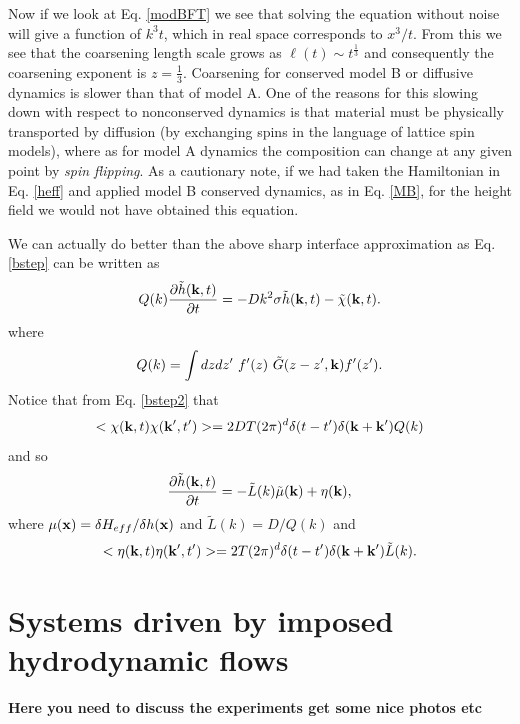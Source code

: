 Now if we look at Eq. \eqref{modBFT} we see that solving the equation without noise will give a function of $k^3t$, which in real space corresponds to $x^3/t$. From this we see that the coarsening length scale grows as $\ell(t) \sim t^{\frac{1}{3}}$ and consequently the coarsening exponent is $z=\frac{1}{3}$.  Coarsening for conserved model B or diffusive dynamics is slower than that of model A. One of the reasons for this slowing down with respect to nonconserved dynamics is that material must be physically transported by diffusion (by exchanging spins in the language of lattice spin models), where as for  model A dynamics the composition can change at any given point by {\em spin flipping}. As a cautionary note, if we had taken the
Hamiltonian in Eq. \eqref{heff} and applied model B conserved dynamics, as in Eq. \eqref{MB},  for the height field we would not have obtained this equation. 

We can actually do better than the above sharp interface approximation as Eq. \eqref{bstep} can be written as
\begin{equation}
    Q(k)\frac{\partial\tilde h({\bf k},t)}{\partial t} =  -Dk^2\sigma \tilde h({\bf k},t) - \tilde \chi({\bf k},t).
    \label{bstep2}
\end{equation}
where 
\begin{equation}
    Q(k)= \int dzdz' \ f'(z)\ \tilde G(z-z',{\bf k}) f'(z').
\end{equation}
Notice that from Eq. \eqref{bstep2} that
\begin{equation}
    < \chi({\bf k},t)\chi({\bf k}',t')>  = 2DT(2\pi)^d \delta(t-t') \delta({\bf k}+{\bf k'}) Q(k)\end{equation}
and so 
\begin{equation}
    \frac{\partial\tilde h({\bf k},t)}{\partial t}= -\tilde L(k) \tilde \mu({\bf k}) + \eta({\bf k}),
\end{equation}
where $\mu({\bf x})=\delta H_{eff}/\delta h({\bf x}) $ and $\tilde L(k) = D/Q(k)$ and 
\begin{equation}
    < \eta({\bf k},t)\eta({\bf k}',t')>  = 2T(2\pi)^d \delta(t-t') \delta({\bf k}+{\bf k'}) \tilde L(k).
\end{equation}

    \section{Systems driven by imposed hydrodynamic flows}
{\bf Here you need to discuss the experiments get some nice photos etc}

